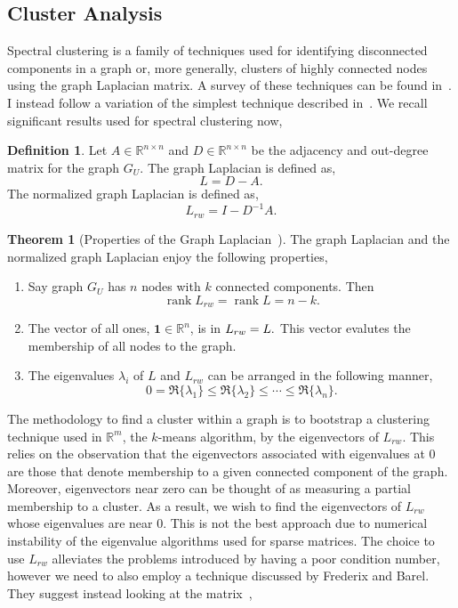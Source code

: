 \documentclass[letterpaper, 10 pt, conference]{ieeeconf}
\theoremstyle{definition}
\newtheorem{definition}{Definition}[section]
\newtheorem{theorem}{Theorem}[section]
\let\ker\relax
\DeclareMathOperator{\rank}{rank}
\DeclareMathOperator{\ker}{ker}
\newcommand{\R}{\mathbb{R}}
\begin{document}
\subsection{Cluster Analysis}\label{sec:implement:cluster}
Spectral clustering is a family of techniques used for identifying disconnected components in a graph or, more generally, clusters of highly connected nodes using the graph Laplacian matrix. A survey of these techniques can be found in~\cite{Article:Survey}. I instead follow a variation of the simplest technique described in~\cite{Notes:Laplacian, Article:LaplacianTutorial}. We recall significant results used for spectral clustering now,
\begin{definition}
  Let \(A\in\R^{n \times n}\) and \(D\in\R^{n\times n}\) be the adjacency and out-degree matrix for the graph \(G_U.\) The graph Laplacian is defined as,
  \[
    L = D - A.
  \]
  The normalized graph Laplacian is defined as,
  \[
    L_{rw} = I - D^{-1}A.
  \]
\end{definition}
\begin{theorem}[Properties of the Graph Laplacian~\cite{Notes:Network}]
  The graph Laplacian and the normalized graph Laplacian enjoy the following properties,
  \begin{enumerate}[label=(\alph*)]
    \item{
      Say graph \(G_U\) has \(n\) nodes with \(k\) connected components. Then \[\rank L_{rw} = \rank L = n - k.\]
    }
    \item{
      The vector of all ones, \(\mathbf{1} \in \R^n\), is in \(\ker L_{rw} = \ker L.\) This vector evalutes the membership of all nodes to the graph.
    }
    \item{
      The eigenvalues \(\lambda_i\) of \(L\) and \(L_{rw}\) can be arranged in the following manner,
      \[
        0 = \Re\{\lambda_1\} \leq \Re\{\lambda_2\} \leq \cdots \leq \Re\{\lambda_n\}.
      \]
    }
  \end{enumerate}
\end{theorem}
The methodology to find a cluster within a graph is to bootstrap a clustering technique used in \(\R^m\), the \(k\)-means algorithm, by the eigenvectors of \(L_{rw}.\) This relies on the observation that the eigenvectors associated with eigenvalues at 0 are those that denote membership to a given connected component of the graph. Moreover, eigenvectors near zero can be thought of as measuring a partial membership to a cluster. As a result, we wish to find the eigenvectors of \(L_{rw}\) whose eigenvalues are near 0. This is not the best approach due to numerical instability of the eigenvalue algorithms used for sparse matrices. The choice to use \(L_{rw}\) alleviates the problems introduced by having a poor condition number, however we need to also employ a technique discussed by Frederix and Barel. They suggest instead looking at the matrix~\cite{Article:CholeskyLaplacian},
\end{document}
